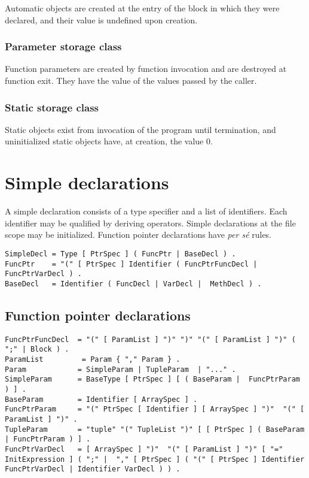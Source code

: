 Automatic objects are created at the entry of the block in which they
were declared, and their value is undefined upon creation.

\hypertarget{parameter-storage-class}{%
\subsubsection{Parameter storage class}\label{parameter-storage-class}}

Function parameters are created by function invocation and are destroyed
at function exit. They have the value of the values passed by the
caller.

\hypertarget{static-storage-class}{%
\subsubsection{Static storage class}\label{static-storage-class}}

Static objects exist from invocation of the program until termination,
and uninitialized static objects have, at creation, the value 0.

\hypertarget{simple-declarations}{%
\section{Simple declarations}\label{simple-declarations}}

A simple declaration consists of a type specifier and a list of
identifiers. Each identifier may be qualified by deriving operators.
Simple declarations at the file scope may be initialized. Function
pointer declarations have \emph{per sé} rules.

\begin{lstlisting}
SimpleDecl = Type [ PtrSpec ] ( FuncPtr | BaseDecl ) . 
FuncPtr    = "(" [ PtrSpec ] Identifier ( FuncPtrFuncDecl | FuncPtrVarDecl ) .
BaseDecl   = Identifier ( FuncDecl | VarDecl |  MethDecl ) .
\end{lstlisting}

\hypertarget{function-pointer-declarations}{%
\subsection{Function pointer
declarations}\label{function-pointer-declarations}}

\begin{lstlisting}
FuncPtrFuncDecl  = "(" [ ParamList ] ")" ")" "(" [ ParamList ] ")" ( ";" | Block ) .
ParamList         = Param { "," Param } .
Param            = SimpleParam | TupleParam  | "..." .
SimpleParam      = BaseType [ PtrSpec ] [ ( BaseParam |  FuncPtrParam ) ] . 
BaseParam        = Identifier [ ArraySpec ] . 
FuncPtrParam     = "(" PtrSpec [ Identifier ] [ ArraySpec ] ")"  "(" [ ParamList ] ")" .
TupleParam       = "tuple" "(" TupleList ")" [ [ PtrSpec ] ( BaseParam | FuncPtrParam ) ] .
FuncPtrVarDecl   = [ ArraySpec ] ")"  "(" [ ParamList ] ")" [ "=" InitExpression ] ( ";" |  "," [ PtrSpec ] ( "(" [ PtrSpec ] Identifier FuncPtrVarDecl | Identifier VarDecl ) ) .
\end{lstlisting}

